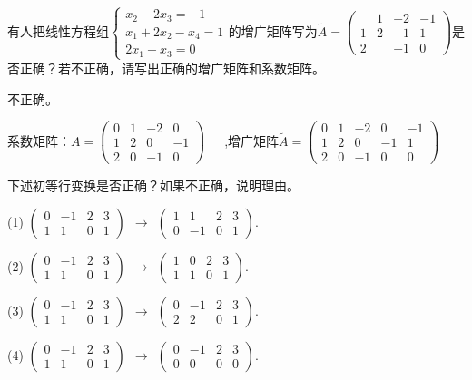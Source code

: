 \documentclass[a4paper]{report}
\begin{document}
\EX 有人把线性方程组$
\begin{cases}
x_2-2x_3=-1\\
x_1+2x_2-x_4=1\\
2x_1-x_3=0
\end{cases}
$的增广矩阵写为$
\widetilde{A} =
\begin{pmatrix}
&1&-2&-1\\ 1 &2 &-1&1\\ 2&&-1&0
\end{pmatrix}
$是否正确？若不正确，请写出正确的增广矩阵和系数矩阵。

\begin{jie}
不正确。

系数矩阵：$
A =
\begin{pmatrix}
0&1&-2&0\\ 1 &2 &0&-1\\ 2&0&-1&0
\end{pmatrix}$~~~,增广矩阵$
\widetilde{A} =
\begin{pmatrix}
0&1&-2&0&-1\\ 1 &2 &0&-1&1\\ 2&0&-1&0&0
\end{pmatrix}$
\end{jie}

\EX 下述初等行变换是否正确？如果不正确，说明理由。

(1)
$
\begin{pmatrix}
0&-1&2&3\\ 1&1 &0&1
\end{pmatrix}~~\rightarrow~~
\begin{pmatrix}
1&1&2&3\\ 0&-1 &0&1
\end{pmatrix}
$.

(2)
$
\begin{pmatrix}
0&-1&2&3\\ 1&1 &0&1
\end{pmatrix}~~\rightarrow~~
\begin{pmatrix}
1&0&2&3\\ 1&1 &0&1
\end{pmatrix}
$.

(3)
$
\begin{pmatrix}
0&-1&2&3\\ 1&1 &0&1
\end{pmatrix}~~\rightarrow~~
\begin{pmatrix}
0&-1&2&3\\ 2&2 &0&1
\end{pmatrix}
$.

(4)
$
\begin{pmatrix}
0&-1&2&3\\ 1&1 &0&1
\end{pmatrix}~~\rightarrow~~
\begin{pmatrix}
0&-1&2&3\\ 0&0 &0&0
\end{pmatrix}
$.
\end{document}
